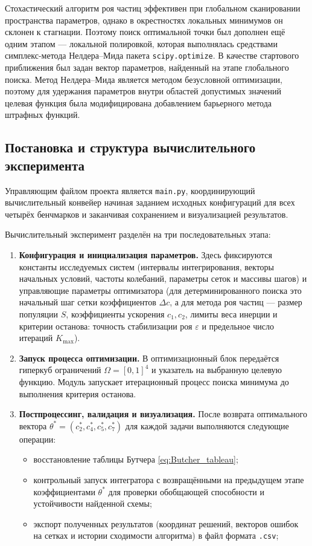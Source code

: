 Стохастический алгоритм роя частиц эффективен при глобальном сканировании пространства параметров, однако в окрестностях локальных минимумов он склонен к стагнации. Поэтому поиск оптимальной точки был дополнен ещё одним этапом — локальной полировкой, которая выполнялась средствами симплекс-метода Нелдера--Мида пакета \texttt{scipy.optimize}. В качестве стартового приближения был задан вектор параметров, найденный на этапе глобального поиска. Метод Нелдера--Мида является методом безусловной оптимизации, поэтому для удержания параметров внутри областей допустимых значений целевая функция была модифицирована добавлением барьерного метода штрафных функций.

\subsection{Постановка и структура вычислительного эксперимента}
Управляющим файлом проекта является \texttt{main.py}, координирующий вычислительный конвейер начиная заданием исходных конфигураций для всех четырёх бенчмарков и заканчивая сохранением и визуализацией результатов. 

Вычислительный эксперимент разделён на три последовательных этапа:
\begin{enumerate}
	\item \textbf{Конфигурация и инициализация параметров.} Здесь фиксируются константы исследуемых систем (интервалы интегрирования, векторы начальных условий, частоты колебаний, параметры сеток и массивы шагов) и управляющие параметры оптимизатора (для детерминированного поиска это начальный шаг сетки коэффициентов $\Delta c$, а для метода роя частиц — размер популяции $S$, коэффициенты ускорения $c_1, c_2$, лимиты веса инерции и критерии останова: точность стабилизации роя $\varepsilon$ и предельное число итераций $K_{\max}$). 
	
	\item \textbf{Запуск процесса оптимизации.} В оптимизационный блок передаётся гиперкуб ограничений $\Omega = [0, 1]^4$ и указатель на выбранную целевую функцию. Модуль запускает итерационный процесс поиска минимума до выполнения критерия останова.
	
	\item \textbf{Постпроцессинг, валидация и визуализация.} После возврата оптимального вектора $\theta^* = (c_2^*, c_4^*, c_5^*, c_7^*)$ для каждой задачи выполняются следующие операции:
	\begin{itemize}
		\item восстановление таблицы Бутчера \eqref{eq:Butcher_tableau};
		\item контрольный запуск интегратора с возвращёнными на предыдущем этапе коэффициентами $\theta^*$ для проверки обобщающей способности и устойчивости найденной схемы;
		\item экспорт полученных результатов (координат решений, векторов ошибок на сетках и истории сходимости алгоритма) в файл формата \texttt{.csv};
	\end{itemize}
\end{enumerate}

